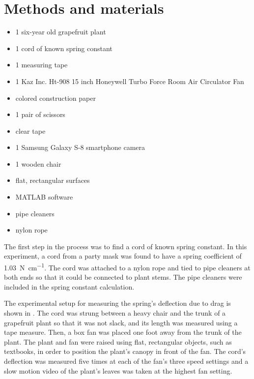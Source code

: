\section{Methods and materials}
\begin{itemize}
\item 1 six-year old grapefruit plant
\item 1 cord of known spring constant
\item 1 measuring tape
\item 1 Kaz Inc. Ht-908 15 inch Honeywell Turbo Force Room Air Circulator Fan
\item colored construction paper
\item 1 pair of scissors
\item clear tape
\item 1 Samsung Galaxy S-8 smartphone camera
\item 1 wooden chair
\item flat, rectangular surfaces
\item MATLAB software
\item pipe cleaners
\item nylon rope
\end{itemize}

	The first step in the process was to find a cord of known spring constant. In this experiment, a cord from a party mask was found to have a spring coefficient of \SI{1.03}{\newton\per\centi\meter}. The cord was attached to a nylon rope and tied to pipe cleaners at both ends so that it could be connected to plant stems. The pipe cleaners were included in the spring constant calculation.

	The experimental setup for measuring the spring's deflection due to drag is shown in . The cord was strung between a heavy chair and the trunk of a grapefruit plant so that it was not slack, and its length was measured using a tape measure. Then, a box fan was placed one foot away from the trunk of the plant. The plant and fan were raised using flat, rectangular objects, such as textbooks, in order to position the plant's canopy in front of the fan. The cord's deflection was measured five times at each of the fan's three speed settings and a slow motion video of the plant's leaves was taken at the highest fan setting.

